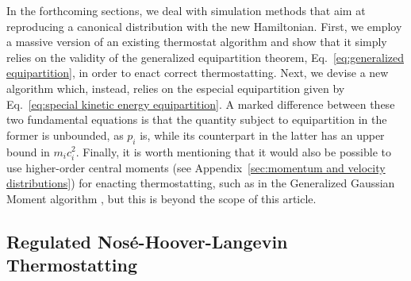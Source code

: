 \documentclass[
aip,
jcp,
reprint,
]{revtex4-1}
\begin{document}
In the forthcoming sections, we deal with simulation methods that aim at reproducing a canonical distribution with the new Hamiltonian.
First, we employ a massive version of an existing thermostat algorithm and show that it simply relies on the validity of the generalized equipartition theorem, Eq.~\eqref{eq:generalized equipartition}, in order to enact correct thermostatting.
Next, we devise a new algorithm which, instead, relies on the especial equipartition given by Eq.~\eqref{eq:special kinetic energy equipartition}.
A marked difference between these two fundamental equations is that the quantity subject to equipartition in the former is unbounded, as $p_i$ is, while its counterpart in the latter has an upper bound in $m_i c_i^2$.
Finally, it is worth mentioning that it would also be possible to use higher-order central moments (see Appendix~\ref{sec:momentum and velocity distributions}) for enacting thermostatting, such as in the Generalized Gaussian Moment algorithm \cite{Liu_2000}, but this is beyond the scope of this article.

\subsection{Regulated Nos\'{e}-Hoover-Langevin Thermostatting}
\label{sec:regulated massive NHL thermostatting}
\end{document}
